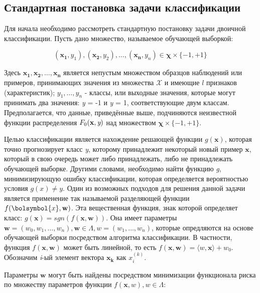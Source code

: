 \documentclass[12pt,a4paper,oneside]{article}
\begin{document}
\begin{multicols}{2}
\vspace*{1em}
\chapter{Стандартная постановка задачи классификации}

\par
Для начала необходимо рассмотреть стандартную постановку задачи двоичной классификации.
Пусть дано множество, называемое обучающей выборкой:

\[
(\mathbf{x_1}, y_1),(\mathbf{x_2}, y_2), \dots, (\mathbf{x_n}, y_n) \in \mathbf{\chi} \times \{-1,+1\}
\]

\par
Здесь \(\mathbf{x_1}, \mathbf{x_2}, \dots, \mathbf{x_n}\) является непустым множеством образцов наблюдений или примеров, принимающих значения из множества \(\mathcal{X}\) и имеющие $l$ признаков (характеристик); \(y_1, \dots, y_n\) - классы, или выходные значения, которые могут принимать два значения: \emph{y} = -1 и \emph{y} = 1, соответствующие двум классам. 
Предполагается, что данные, приведённые выше, подчиняются неизвестной функции распределения \(F_0(\mathbf{x}, \emph{y})\) над множеством \(\mathbf{\chi} \times \{-1, +1\}\). 

\par
Целью классификации является нахождение решающей функции \(g(\mathbf{x})\), которая точно прогнозирует класс \emph{y}, которому принадлежит некоторый новый пример \(\mathbf{x}\), который в свою очередь может либо принадлежать, либо не принадлежать обучающей выборке. 
Другими словами, необходимо найти функцию \emph{g}, минимизирующую ошибку классификации, которая определяется вероятностью условия \(g(x) \neq y\). 
Один из возможных подходов для решения данной задачи является применение так называемой разделяющей функции \(f(\bolsymbol{x}, \mathbf{w})\). 
Эта вещественная функция, знак которой определяет класс: \(g(\mathbf{x})=sgn(f(\mathbf{x}, \mathbf{w}))\).
Она имеет параметры \(\mathbf{w}=(w_0, w_1, \dots, w_n), \mathbf{w} \in \Lambda, w = (w_1, \dots, w_n)\), которые опредляются на основе обучающей выборки посредством алгоритма классификации. 
В частности, функция \(f(\mathbf{x}, \mathbf{w})\) может быть линейной, то есть \(f(\mathbf{x}, \mathbf{w}) = \langle w, \mathbf{x} \rangle + w_0\). 
Обозначим \emph{i}-ый элемент вектора \(\mathbf{x_k}\) как \(x_i^{(k)}\). 

\par
Параметры \(\mathbf{w}\) могут быть найдены посредством минимизации функционала риска по множеству параметров функции \(f(\mathbf{x}, w), w \in \Lambda\):


\end{multicols}
\end{document}
